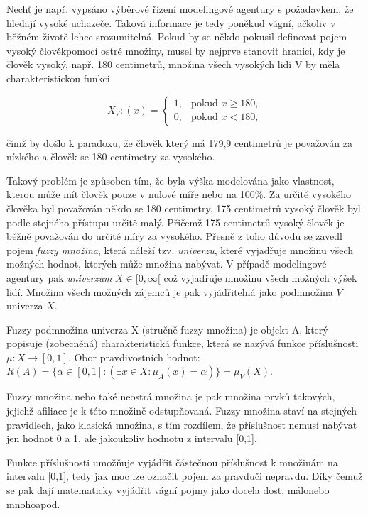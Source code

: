 Nech\v t je např. vypsáno výběrové řízení modelingové agentury s požadavkem, že hledají vysoké uchazeče. Taková informace je tedy poněkud vágní, ačkoliv v běžném životě lehce srozumitelná. Pokud by se někdo pokusil definovat pojem \clqq vysoký člověk\crqq \space pomocí ostré množiny, musel by nejprve stanovit hranici, kdy je člověk vysoký, např. 180 centimetr\r u, množina všech vysokých lidí V by měla charakteristickou funkci

    $$X_V:(x)=\begin{cases} 1, & \mbox{pokud }  x \geq 180,\\    0, & \mbox{pokud } x < 180,  \end{cases}$$

    čímž by došlo k paradoxu, že člověk který má 179,9 centimetr\r u je považován za nízkého a člověk se 180 centimetry za vysokého.

    Takový problém je zp\r usoben tím, že byla výška modelována jako vlastnost, kterou m\r uže mít člověk pouze v nulové míře nebo na 100\%. Za určitě vysokého člověka byl považován někdo se 180 centimetry, 175 centimetr\r u vysoký člověk byl podle stejného přístupu určitě malý. Přičemž 175 centimetr\r u vysoký člověk je běžně považován do určité míry za vysokého. Přesně z toho d\r uvodu se zavedl pojem \textit{fuzzy množina}, která náleží tzv. \textit{univerzu}, které vyjadřuje množinu všech možných hodnot, kterých může množina nabývat. V případě modelingové agentury  pak \textit{univerzum} $X \in [0,\infty[$ což vyjadřuje množinu všech možných výšek lidí. Množina všech možných zájemc\r u je pak vyjádřitelná jako podmnožina $V$ univerza $X.$\\
    \begin{definition}
    \cite{navara}
        Fuzzy podmnožina univerza X (stručně fuzzy množina) je objekt A, který popisuje (zobecněná) charakteristická funkce, která se nazývá funkce příslušnosti $\mu: X \rightarrow [0,1]$. Obor pravdivostních hodnot: $R(A) = \{\alpha \in [0,1]: (\exists x \in X : \mu_A(x) = \alpha)\} = \mu_V(X).$
    \end{definition}
    
    Fuzzy množina nebo také neostrá množina je pak množina prvků takových, jejichž afiliace je k této množině odstupňovaná. Fuzzy množina staví na stejných pravidlech, jako klasická množina, s tím rozdílem, že příslušnost nemusí nabývat jen hodnot 0 a 1, ale jakoukoliv hodnotu z intervalu [0,1]. 
   
    Funkce příslušnosti umož\v nuje vyjádřit částečnou příslušnost k množinám na intervalu [0,1], tedy jak moc lze označit pojem za \clqq pravdu\crqq \space či \clqq nepravdu\crqq. Díky čemuž se pak dají matematicky vyjádřit vágní pojmy jako \clqq docela dost\crqq, \clqq málo\crqq \space nebo \clqq mnoho\crqq \space apod.

